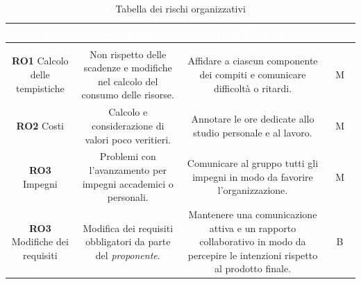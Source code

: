 \begin{center}
\begin{longtable}{C{\colA} | C{\colB} | C{\colC} | C{\colD}}
		\textcolor{white}{\textbf{Codice}} & 
		\textcolor{white}{\textbf{Descrizione}} & 
		\textcolor{white}{\textbf{Identificazione}} & 
		\textcolor{white}{\textbf{Occ.}} \\
		\endfirsthead
	    \\
	    \endfoot
	    \caption{Tabella dei rischi organizzativi}
	    \endlastfoot

\textbf{RO1} \newline Calcolo delle tempistiche &

Non rispetto delle scadenze e modifiche nel calcolo del consumo delle risorse. & 

Affidare a ciascun componente dei compiti e comunicare difficoltà o ritardi.  & 

M \\
\textbf{RO2} \newline Costi &

Calcolo e considerazione di valori poco veritieri.  & 

Annotare le ore dedicate allo studio personale e al lavoro.  & 

M \\
\textbf{RO3} \newline Impegni &

Problemi con l'avanzamento per impegni accademici o personali.  & 

Comunicare al gruppo tutti gli impegni in modo da favorire l'organizzazione.  & 

M \\

\textbf{RO3} \newline Modifiche dei requisiti &

Modifica dei requisiti obbligatori da parte del \textit{proponente}.  & 

Mantenere una comunicazione attiva e un rapporto collaborativo in modo da percepire le intenzioni rispetto al prodotto finale.  & 

B\\

\end{longtable}
\end{center}

